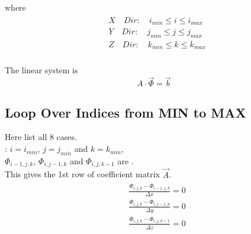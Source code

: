 \documentclass{article}
\numberwithin{equation}{subsection}
\begin{document}
where
\begin{align}
\begin{split}
& X \quad Dir: \quad i_{min} \leq i \leq i_{max}\\
& Y \quad Dir: \quad j_{min} \leq j \leq j_{max}\\
& Z \quad Dir: \quad k_{min} \leq k \leq k_{max}\\
\end{split}
\end{align}

The linear system is 
\begin{equation}
A \cdot \vec{\Phi} = \vec{b}
\end{equation}

\subsection{Loop Over Indices from MIN to MAX}
Here list all 8 cases.\\
: $i = i_{min}$, $j = j_{min}$ and $k = k_{min}$, \\
$\Phi_{i-1,j,k}$, $\Phi_{i,j-1,k}$ and $\Phi_{i,j,k-1}$ are .\\
This gives the 1st row of coefficient matrix $\vec{A}$.
\begin{align}
\begin{split}
& \frac{\Phi_{i,j,k} - \Phi_{i-1,j,k}}{\Delta x} = 0 \\
& \frac{\Phi_{i,j,k} - \Phi_{i,j-1,k}}{\Delta y} = 0 \\
& \frac{\Phi_{i,j,k} - \Phi_{i,j,k-1}}{\Delta z} = 0
\end{split}
\end{align}
\end{document}
